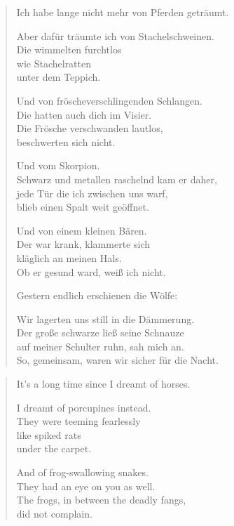 
{\setlength{\stanzaskip}{0.5em}

\cleartoverso


\begin{verse}
Ich habe lange nicht mehr von Pferden geträumt.

Aber dafür träumte ich von Stachelschweinen.\\
Die wimmelten furchtlos\\
wie Stachelratten\\
unter dem Teppich.

Und von fröscheverschlingenden Schlangen.\\
Die hatten auch dich im Visier.\\
Die Frösche verschwanden lautlos,\\
beschwerten sich nicht.

Und vom Skorpion.\\
Schwarz und metallen raschelnd kam er daher,\\
jede Tür die ich zwischen uns warf,\\
blieb einen Spalt weit geöffnet.

Und von einem kleinen Bären.\\
Der war krank, klammerte sich\\
kläglich an meinen Hals.\\
Ob er gesund ward, weiß ich nicht.

Gestern endlich erschienen die Wölfe:

Wir lagerten uns still in die Dämmerung.\\
Der große schwarze ließ seine Schnauze\\
auf meiner Schulter ruhn, sah mich an.\\
So, gemeinsam, waren wir sicher für die Nacht.
\end{verse}

\cleartorecto


\begin{verse}
It's a long time since I dreamt of horses.

I dreamt of porcupines instead.\\
They were teeming fearlessly\\
like spiked rats\\
under the carpet.

And of frog-swallowing snakes.\\
They had an eye on you as well.\\
The frogs, in between the deadly fangs,\\
did not complain.


\end{verse}}
